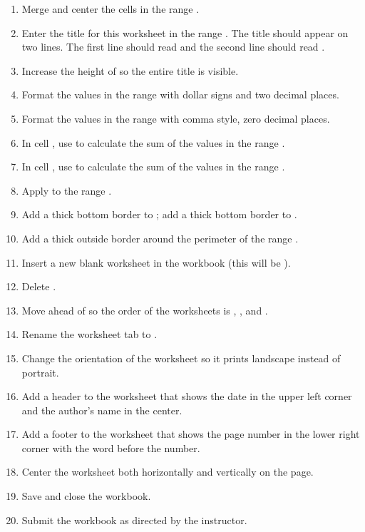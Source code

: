 \begin{enumbox}
\begin{enumerate}
		\item Merge and center the cells in the range .
		\item Enter the title for this worksheet in the range . The title should appear on two lines. The first line should read  and the second line should read .
		\item Increase the height of  so the entire title is visible.
		\item Format the values in the range  with dollar signs and two decimal places.
		\item Format the values in the range  with comma style, zero decimal places.
		\item In cell , use  to calculate the sum of the values in the range .
		\item In cell , use  to calculate the sum of the values in the range .
		\item Apply  to the range .
		\item Add a thick bottom border to ; add a thick bottom border to .
		\item Add a thick outside border around the perimeter of the range .
		\item Insert a new blank worksheet in the workbook (this will be ).
		\item Delete .
		\item Move  ahead of  so the order of the worksheets is , , and .
		\item Rename the  worksheet tab to .
		\item Change the orientation of the  worksheet so it prints landscape instead of portrait.
		\item Add a header to the  worksheet that shows the date in the upper left corner and the author's name in the center.
		\item Add a footer to the  worksheet that shows the page number in the lower right corner with the word  before the number.
		\item Center the worksheet both horizontally and vertically on the page.
		\item Save and close the  workbook.
		\item Submit the  workbook as directed by the instructor.
	\end{enumerate}
\end{enumbox}
